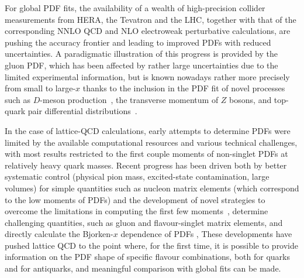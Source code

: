 For global PDF fits, the availability of a wealth of high-precision collider measurements
from HERA, the Tevatron and the LHC, together with that of the corresponding
NNLO QCD and NLO electroweak perturbative calculations, are pushing the
accuracy frontier and leading to improved PDFs with reduced uncertainties.
%
A paradigmatic illustration of this progress is provided by the gluon PDF, which has been
affected by rather large uncertainties due to the limited experimental
information, but is known nowadays rather more precisely from small to large-$x$
thanks to the inclusion in the
PDF fit of novel processes such as $D$-meson production~\cite{Gauld:2016kpd},
the transverse momentum of $Z$ bosons, and top-quark pair differential
distributions~\cite{Czakon:2016olj}. 

In the case of lattice-QCD calculations, early attempts to determine PDFs were limited by the 
available computational resources and various technical challenges, with most results restricted to
the first couple moments of non-singlet PDFs at relatively heavy quark masses. Recent progress has been driven both
by better systematic control (physical pion mass, excited-state contamination, large volumes) 
for simple quantities such as nucleon matrix elements (which correspond to the low moments of PDFs) and the development of novel
strategies to overcome the limitations in computing the first few 
moments~\cite{Constantinou:2014tga,Syritsyn:2014saa,Lin:2012ev}, determine challenging quantities, 
such as gluon and flavour-singlet matrix elements, and directly calculate the Bjorken-$x$ dependence of PDFs \cite{Lin:2014zya,Alexandrou:2015rja,Chen:2016utp,Alexandrou:2016jqi},
These developments have pushed lattice QCD to the point where, for the first time, it is possible to provide information on the PDF shape
of specific flavour combinations, both for quarks and for antiquarks, and meaningful comparison with 
global fits can be made.

